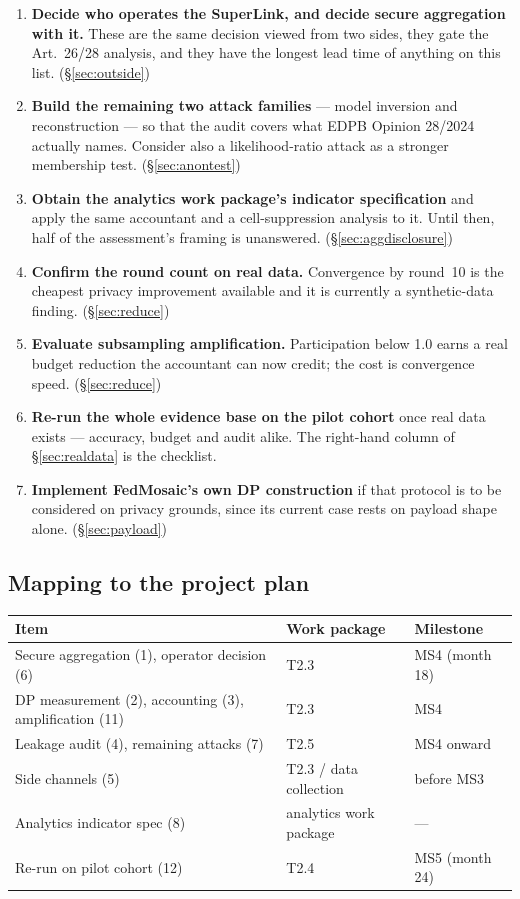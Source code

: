 \begin{enumerate}[start=6]
  \item \textbf{Decide who operates the SuperLink, and decide secure aggregation with it.} These are
        the same decision viewed from two sides, they gate the Art.~26/28 analysis, and they have the
        longest lead time of anything on this list. (\S\ref{sec:outside})
  \item \textbf{Build the remaining two attack families} --- model inversion and reconstruction ---
        so that the audit covers what EDPB Opinion 28/2024 actually names. Consider also a
        likelihood-ratio attack as a stronger membership test. (\S\ref{sec:anontest})
  \item \textbf{Obtain the analytics work package's indicator specification} and apply the same
        accountant and a cell-suppression analysis to it. Until then, half of the assessment's
        framing is unanswered. (\S\ref{sec:aggdisclosure})
  \item \textbf{Confirm the round count on real data.} Convergence by round~10 is the cheapest
        privacy improvement available and it is currently a synthetic-data finding.
        (\S\ref{sec:reduce})
  \item \textbf{Evaluate subsampling amplification.} Participation below 1.0 earns a real budget
        reduction the accountant can now credit; the cost is convergence speed. (\S\ref{sec:reduce})
  \item \textbf{Re-run the whole evidence base on the pilot cohort} once real data exists ---
        accuracy, budget and audit alike. The right-hand column of \S\ref{sec:realdata} is the
        checklist.
  \item \textbf{Implement FedMosaic's own DP construction} if that protocol is to be considered on
        privacy grounds, since its current case rests on payload shape alone. (\S\ref{sec:payload})
\end{enumerate}

\subsection*{Mapping to the project plan}

\begin{center}
\small
\begin{tabular}{lll}
  \toprule
  Item & Work package & Milestone \\
  \midrule
  Secure aggregation (1), operator decision (6) & T2.3 & MS4 (month 18) \\
  DP measurement (2), accounting (3), amplification (11) & T2.3 & MS4 \\
  Leakage audit (4), remaining attacks (7) & T2.5 & MS4 onward \\
  Side channels (5) & T2.3 / data collection & before MS3 \\
  Analytics indicator spec (8) & analytics work package & --- \\
  Re-run on pilot cohort (12) & T2.4 & MS5 (month 24) \\
  \bottomrule
\end{tabular}
\end{center}
